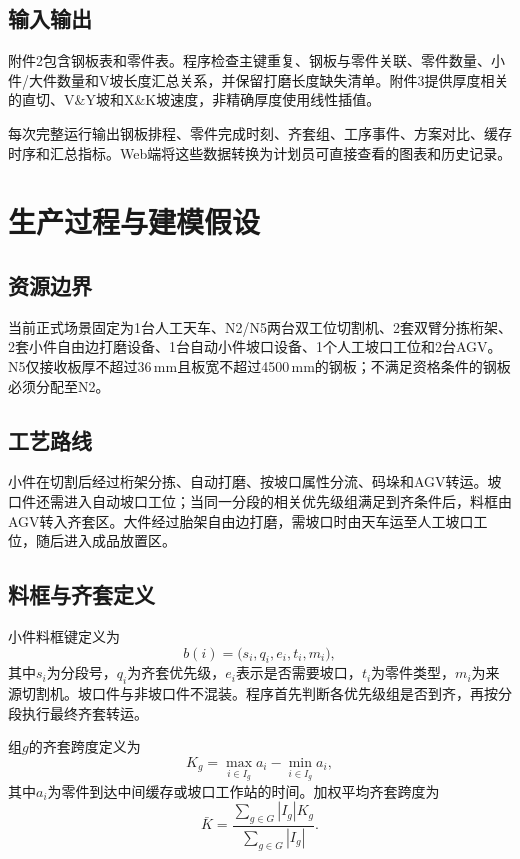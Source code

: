 \documentclass[UTF8,zihao=-4,openany]{ctexrep}
\begin{document}
\section{输入输出}

附件2包含钢板表和零件表。程序检查主键重复、钢板与零件关联、零件数量、小件/大件数量和V坡长度汇总关系，并保留打磨长度缺失清单。附件3提供厚度相关的直切、V\&Y坡和X\&K坡速度，非精确厚度使用线性插值。

每次完整运行输出钢板排程、零件完成时刻、齐套组、工序事件、方案对比、缓存时序和汇总指标。Web端将这些数据转换为计划员可直接查看的图表和历史记录。

\chapter{生产过程与建模假设}

\section{资源边界}

当前正式场景固定为1台人工天车、N2/N5两台双工位切割机、2套双臂分拣桁架、2套小件自由边打磨设备、1台自动小件坡口设备、1个人工坡口工位和2台AGV。N5仅接收板厚不超过36\,mm且板宽不超过4500\,mm的钢板；不满足资格条件的钢板必须分配至N2。

\section{工艺路线}

小件在切割后经过桁架分拣、自动打磨、按坡口属性分流、码垛和AGV转运。坡口件还需进入自动坡口工位；当同一分段的相关优先级组满足到齐条件后，料框由AGV转入齐套区。大件经过胎架自由边打磨，需坡口时由天车运至人工坡口工位，随后进入成品放置区。

\section{料框与齐套定义}

小件料框键定义为
\begin{equation}
 b(i)=\bigl(s_i,q_i,e_i,t_i,m_i\bigr),
\end{equation}
其中$s_i$为分段号，$q_i$为齐套优先级，$e_i$表示是否需要坡口，$t_i$为零件类型，$m_i$为来源切割机。坡口件与非坡口件不混装。程序首先判断各优先级组是否到齐，再按分段执行最终齐套转运。

组$g$的齐套跨度定义为
\begin{equation}
 K_g=\max_{i\in I_g}a_i-\min_{i\in I_g}a_i,
\end{equation}
其中$a_i$为零件到达中间缓存或坡口工作站的时间。加权平均齐套跨度为
\begin{equation}
 \bar K=\frac{\sum_{g\in G}|I_g|K_g}{\sum_{g\in G}|I_g|}.
\end{equation}
\end{document}
